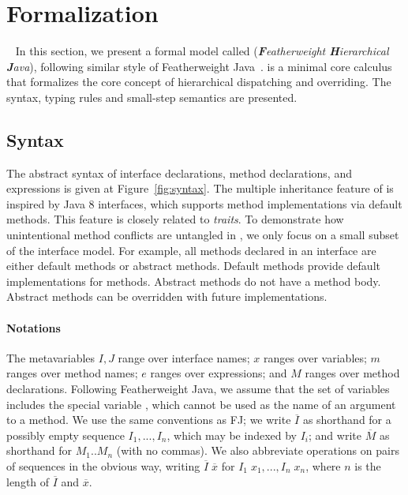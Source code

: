\section{Formalization}~\label{sec:formalization}
In this section, we present a formal model called \MIM{} (\emph{\textbf{F}eatherweight \textbf{H}ierarchical \textbf{J}ava}), following similar style of 
Featherweight Java~\cite{Igarashi01FJ}. \MIM{} is a minimal core calculus that formalizes the core concept of hierarchical dispatching and overriding. The syntax, typing rules and small-step semantics are presented.

\subsection{Syntax}
The abstract syntax of \MIM{} interface declarations, method declarations, and expressions is given at Figure~\ref{fig:syntax}. The multiple
inheritance feature of \MIM{} is inspired by Java 8 interfaces, which supports
method implementations via default methods. This feature is 
closely related to \emph{traits}. To demonstrate how
unintentional method conflicts are untangled in \MIM{}, we only focus on a small subset of the interface model. For example, all methods declared
in an interface are either default methods or abstract methods. Default methods provide default implementations for methods. Abstract methods do not
have a method body. Abstract methods can be overridden with future implementations.

\paragraph{Notations}
The metavariables $I, J$ range over interface names; $x$ ranges over variables; $m$ ranges over method names; $e$ ranges over expressions; and $M$ ranges over method declarations. Following Featherweight Java, we assume that the set of variables includes the special variable \kwthis, which cannot be used as the name of an argument to a method. We use the same
conventions as FJ; we write $\overline{I}$ as shorthand for a possibly empty sequence $I_1, ..., I_n$, which may be indexed by $I_i$; and write $\overline{M}$ as shorthand for $M_1 .. M_n$ (with no commas). We also abbreviate operations on pairs of sequences in the obvious way, writing $\overline{I} \; \overline{x}$ for $I_1 \; x_1, ..., I_n \; x_n$, where $n$ is the length of $\overline{I}$ and $\overline{x}$.

